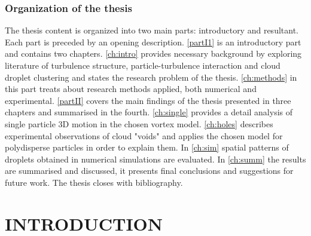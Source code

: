 \section{Organization of the thesis}
The thesis content is organized into two main parts: introductory and resultant. Each part is preceded by an opening description. \autoref{partI1} is an introductory part and contains two chapters. \autoref{ch:intro} provides necessary background by exploring literature of turbulence structure, particle-turbulence interaction and cloud droplet clustering and states the research problem of the thesis. \autoref{ch:methods} in this part treats about research methods applied, both numerical and experimental. \autoref{partII} covers the main findings of the thesis presented in three chapters and summarised in the fourth. \autoref{ch:single} provides a detail analysis of single particle 3D motion in the chosen vortex model. \autoref{ch:holes} describes experimental observations of cloud "voids" and applies the chosen model for polydisperse particles in order to explain them. In \autoref{ch:sim} spatial patterns of droplets obtained in numerical simulations are evaluated. In \autoref{ch:summ} the results are summarised and discussed, it presents final conclusions and suggestions for future work. The thesis closes with bibliography.\\


%
%

\part{INTRODUCTION} %
\label{partI1}

